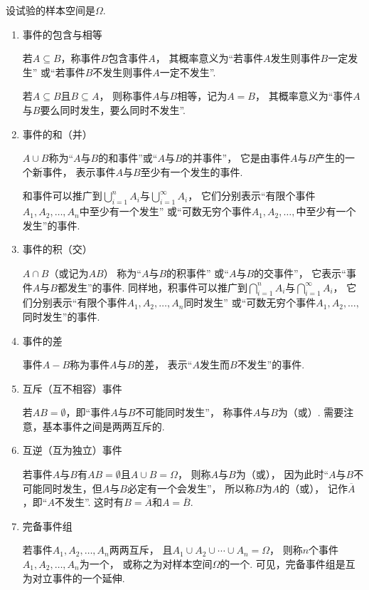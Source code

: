 设试验的样本空间是\(\Omega\).
\begin{enumerate}
	\item 事件的包含与相等

	若\(A \subseteq B\)，称事件\(B\)包含事件\(A\)，
	其概率意义为“若事件\(A\)发生则事件\(B\)一定发生”
	或“若事件\(B\)不发生则事件\(A\)一定不发生”.

	若\(A \subseteq B\)且\(B \subseteq A\)，
	则称事件\(A\)与\(B\)相等，记为\(A = B\)，
	其概率意义为“事件\(A\)与\(B\)要么同时发生，要么同时不发生”.

	\item 事件的和（并）

	\(A \cup B\)称为“\(A\)与\(B\)的和事件”或“\(A\)与\(B\)的并事件”，
	它是由事件\(A\)与\(B\)产生的一个新事件，
	表示事件\(A\)与\(B\)至少有一个发生的事件.

	和事件可以推广到\(\bigcup_{i=1}^n A_i\)与\(\bigcup_{i=1}^\infty A_i\)，
	它们分别表示“有限个事件\(A_1,A_2,\dotsc,A_n\)中至少有一个发生”
	或“可数无穷个事件\(A_1,A_2,\dotsc,\)中至少有一个发生”的事件.

	\item 事件的积（交）

	\(A \cap B\)（或记为\(AB\)）
	称为“\(A\)与\(B\)的积事件”
	或“\(A\)与\(B\)的交事件”，
	它表示“事件\(A\)与\(B\)都发生”的事件.
	同样地，积事件可以推广到\(\bigcap_{i=1}^n A_i\)与\(\bigcap_{i=1}^\infty A_i\)，
	它们分别表示“有限个事件\(A_1,A_2,\dotsc,A_n\)同时发生”
	或“可数无穷个事件\(A_1,A_2,\dotsc,\)同时发生”的事件.

	\item 事件的差

	事件\(A-B\)称为事件\(A\)与\(B\)的差，
	表示“\(A\)发生而\(B\)不发生”的事件.

	\item 互斥（互不相容）事件

	若\(AB = \emptyset\)，即“事件\(A\)与\(B\)不可能同时发生”，
	称事件\(A\)与\(B\)为（或）.
	需要注意，基本事件之间是两两互斥的.

	\item 互逆（互为独立）事件

	若事件\(A\)与\(B\)有\(AB = \emptyset\)且\(A \cup B = \Omega\)，
	则称\(A\)与\(B\)为（或），
	因为此时“\(A\)与\(B\)不可能同时发生，但\(A\)与\(B\)必定有一个会发生”，
	所以称\(B\)为\(A\)的（或），
	记作\(\overline{A}\)，即“\(A\)不发生”.
	这时有\(B = \overline{A}\)和\(A = \overline{B}\).

	\item 完备事件组

	若事件\(A_1,A_2,\dotsc,A_n\)两两互斥，
	且\(A_1 \cup A_2 \cup \dotsb \cup A_n = \Omega\)，
	则称\(n\)个事件\(A_1,A_2,\dotsc,A_n\)为一个，
	或称之为对样本空间\(\Omega\)的一个.
	可见，完备事件组是互为对立事件的一个延伸.
\end{enumerate}

